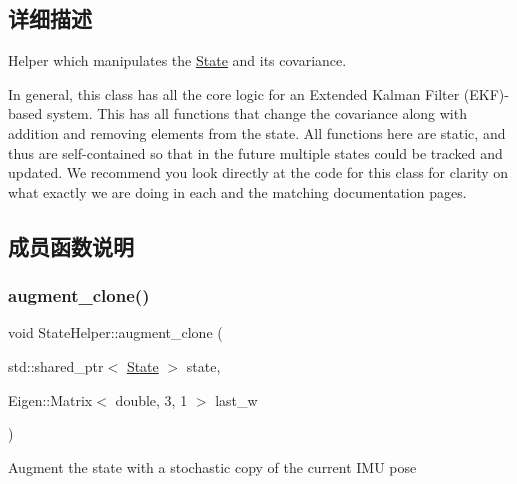 \subsection{详细描述}
Helper which manipulates the \hyperlink{classov__msckf_1_1State}{State} and its covariance. 

In general, this class has all the core logic for an Extended Kalman Filter (E\+KF)-\/based system. This has all functions that change the covariance along with addition and removing elements from the state. All functions here are static, and thus are self-\/contained so that in the future multiple states could be tracked and updated. We recommend you look directly at the code for this class for clarity on what exactly we are doing in each and the matching documentation pages. 

\subsection{成员函数说明}
\mbox{\label{classov__msckf_1_1StateHelper_ade3a86a89f15cc6e03a6430fd1dee694}} 
\subsubsection{\texorpdfstring{augment\+\_\+clone()}{augment\_clone()}}
{\footnotesize\ttfamily void State\+Helper\+::augment\+\_\+clone (\begin{DoxyParamCaption}\item[{std\+::shared\+\_\+ptr$<$ \hyperlink{classov__msckf_1_1State}{State} $>$}]{state,  }\item[{Eigen\+::\+Matrix$<$ double, 3, 1 $>$}]{last\+\_\+w }\end{DoxyParamCaption})\hspace{0.3cm}{\ttfamily [static]}}



Augment the state with a stochastic copy of the current I\+MU pose 


